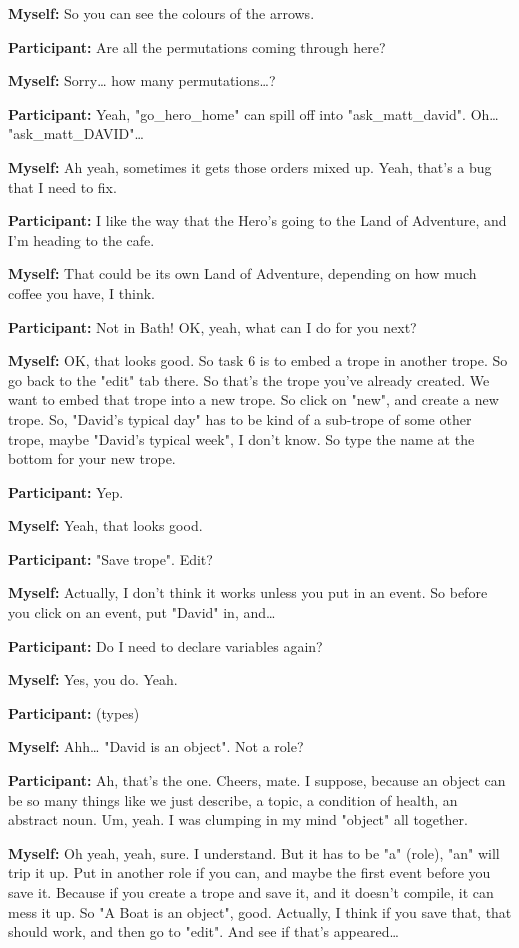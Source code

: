 \documentclass[11pt]{report}
\begin{document}
\begin{linenumbers}
\textbf{Myself:} So you can see the colours of the arrows.

\textbf{Participant:} Are all the permutations coming through here?

\textbf{Myself:} Sorry\ldots{} how many permutations\ldots{}?

\textbf{Participant:} Yeah, "go_hero_home" can spill off into "ask_matt_david". Oh\ldots{} "ask_matt_DAVID"\ldots{}

\textbf{Myself:} Ah yeah, sometimes it gets those orders mixed up. Yeah, that's a bug that I need to fix.

\textbf{Participant:} I like the way that the Hero's going to the Land of Adventure, and I'm heading to the cafe.

\textbf{Myself:} That could be its own Land of Adventure, depending on how much coffee you have, I think.

\textbf{Participant:} Not in Bath! OK, yeah, what can I do for you next?

\textbf{Myself:} OK, that looks good. So task 6 is to embed a trope in another trope. So go back to the "edit" tab there. So that's the trope you've already created. We want to embed that trope into a new trope. So click on "new", and create a new trope. So, "David's typical day" has to be kind of a sub-trope of some other trope, maybe "David's typical week", I don't know. So type the name at the bottom for your new trope.

\textbf{Participant:} Yep.

\textbf{Myself:} Yeah, that looks good.

\textbf{Participant:} "Save trope". Edit?

\textbf{Myself:} Actually, I don't think it works unless you put in an event. So before you click on an event, put "David" in, and\ldots{}

\textbf{Participant:} Do I need to declare variables again?

\textbf{Myself:} Yes, you do. Yeah.

\textbf{Participant:} (types)

\textbf{Myself:} Ahh\ldots{} "David is an object". Not a role?

\textbf{Participant:} Ah, that's the one. Cheers, mate. I suppose, because an object can be so many things like we just describe, a topic, a condition of health, an abstract noun. Um, yeah. I was clumping in my mind "object" all together.

\textbf{Myself:} Oh yeah, yeah, sure. I understand. But it has to be "a" (role), "an" will trip it up. Put in another role if you can, and maybe the first event before you save it. Because if you create a trope and save it, and it doesn't compile, it can mess it up. So "A Boat is an object", good. Actually, I think if you save that, that should work, and then go to "edit". And see if that's appeared\ldots{}


\end{linenumbers}
\end{document}
